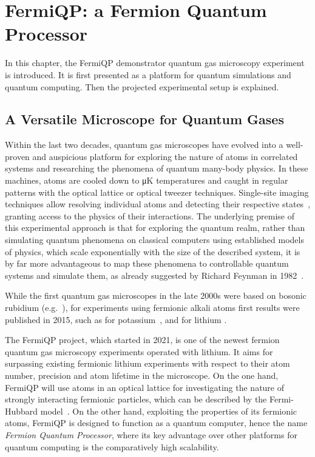 \renewcommand{\imagepath}{../20-fermiqp/img}

\chapter{FermiQP: a Fermion Quantum Processor}
In this chapter, the FermiQP demonstrator quantum gas microscopy experiment is introduced. It is first presented as a platform for quantum simulations and quantum computing. Then the projected experimental setup is explained.

\section{A Versatile Microscope for Quantum Gases}
Within the last two decades, quantum gas microscopes have evolved into a well-proven and auspicious platform for exploring the nature of atoms in correlated systems and researching the phenomena of quantum many-body physics. In these machines, atoms are cooled down to \si[]{\micro\kelvin} temperatures and caught in regular patterns with the optical lattice or optical tweezer techniques. Single-site imaging techniques allow resolving individual atoms and detecting their respective states~\cite{bloch_many-body_2008,gross_quantum_2017}, granting access to the physics of their interactions. The underlying premise of this experimental approach is that for exploring the quantum realm, rather than simulating quantum phenomena on classical computers using established models of physics, which scale exponentially with the size of the described system, it is by far more advantageous to map these phenomena to controllable quantum systems and simulate them, as already suggested by Richard Feynman in 1982~\cite{feynman_simulating_1982}.

While the first quantum gas microscopes in the late 2000s were based on bosonic rubidium (e.g.~\cite{sherson_single-atom-resolved_2010}), for experiments using fermionic alkali atoms  first results were published in 2015, such as for potassium~\cite{cheuk_quantum-gas_2015}, and for lithium \cite{parsons_site-resolved_2015, omran_microscopic_2015}.

The FermiQP project, which started in 2021, is one of the newest fermion quantum gas microscopy experiments operated with lithium. It aims for surpassing existing fermionic lithium experiments with respect to their atom number, precision and atom lifetime in the microscope. On the one hand, FermiQP will use atoms in an optical lattice for investigating the nature of strongly interacting fermionic particles, which can be described by the Fermi-Hubbard model~\cite{hubbard_electron_1963, esslinger_fermi-hubbard_2010}. On the other hand, exploiting the properties of its fermionic atoms, FermiQP is designed to function as a quantum computer, hence the name \textit{Fermion Quantum Processor}, where its key advantage over other platforms for quantum computing is the comparatively high scalability.

